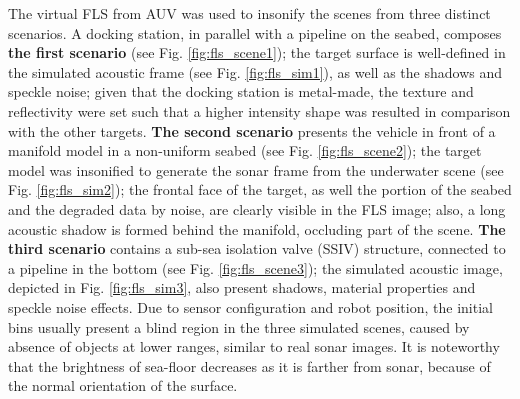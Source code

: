 \documentclass[final,5p,times]{elsarticle}
\begin{document}
The virtual FLS from AUV was used to insonify the scenes from three distinct
scenarios. A docking station, in parallel with a pipeline on the seabed,
composes \textbf{the first scenario} (see Fig. \ref{fig:fls_scene1}); the
target surface is well-defined in the simulated acoustic frame (see
Fig. \ref{fig:fls_sim1}), as well as the shadows and speckle noise; given that the docking station is metal-made, the texture and reflectivity were set such
that a higher intensity shape was resulted in comparison with the other targets.
\textbf{The second scenario} presents the vehicle in front of a manifold model
in a non-uniform seabed (see Fig. \ref{fig:fls_scene2}); the target model was
insonified to generate the sonar frame from the underwater scene (see Fig. \ref{fig:fls_sim2}); the frontal
face of the target, as well the portion of the seabed and the degraded data
by noise, are clearly visible in the FLS image; also, a long acoustic shadow
is formed behind the manifold, occluding part of the scene. \textbf{The
third scenario} contains a sub-sea isolation valve (SSIV) structure, connected
to a pipeline in the bottom (see Fig. \ref{fig:fls_scene3}); the simulated
acoustic image, depicted in Fig. \ref{fig:fls_sim3}, also present shadows,
material properties and speckle noise effects. Due to sensor configuration and
robot position, the initial bins usually present a blind region in the three
simulated scenes, caused by absence of objects at lower ranges, similar to real
sonar images. It is noteworthy that the brightness of sea-floor decreases as it is
farther from sonar, because of the normal orientation of the surface.
\end{document}
